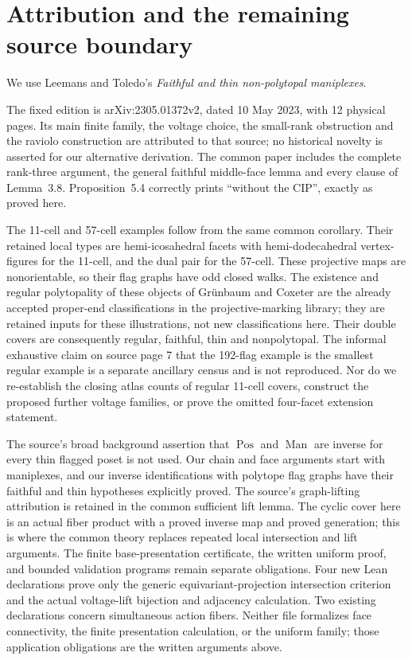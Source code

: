\documentclass[a4paper,11pt]{article}
\begin{document}
\section{Attribution and the remaining source boundary}
We use Leemans and Toledo's \emph{Faithful and thin non-polytopal
maniplexes}.

The fixed edition is arXiv:2305.01372v2, dated 10 May 2023,
with 12 physical pages. Its main finite family, the voltage choice, the small-rank
obstruction and the raviolo construction are attributed to that source;
no historical novelty is asserted for our alternative derivation.
The common paper includes the complete rank-three argument, the general
faithful middle-face lemma and every clause of Lemma~3.8. Proposition~5.4
correctly prints ``without the CIP'', exactly as proved here.

The 11-cell and 57-cell examples follow from the same common corollary.
Their retained local types are hemi-icosahedral facets with hemi-dodecahedral vertex-figures for
the 11-cell, and the dual pair for the 57-cell. These projective maps are nonorientable,
so their flag graphs have odd closed walks. The existence and regular
polytopality of these objects of Gr\"unbaum and Coxeter are the already accepted
proper-end classifications in the projective-marking library; they are
retained inputs for these illustrations, not new classifications here.
Their double covers are consequently regular, faithful, thin and
nonpolytopal. The informal exhaustive claim on source page 7 that the
192-flag example is the smallest regular example is a separate ancillary
census and is not reproduced. Nor do we re-establish the closing atlas
counts of regular 11-cell covers, construct the proposed further voltage
families, or prove the omitted four-facet extension statement.

The source's broad background assertion that $\operatorname{Pos}$ and
$\operatorname{Man}$ are inverse for every thin flagged poset is not used.
Our chain and face arguments start with maniplexes, and our inverse
identifications with polytope flag graphs have their faithful and thin
hypotheses explicitly proved. The source's graph-lifting attribution is
retained in the common sufficient lift lemma. The cyclic cover here is
an actual fiber product with a proved inverse map and proved generation;
this is where the common theory replaces repeated local intersection
and lift arguments. The finite base-presentation certificate, the
written uniform proof, and bounded validation programs remain
separate obligations. Four new Lean declarations prove only the generic
equivariant-projection intersection criterion and the actual voltage-lift
bijection and adjacency calculation. Two existing declarations concern
simultaneous action fibers. Neither file formalizes face connectivity,
the finite presentation calculation, or the uniform family; those
application obligations are the written arguments above.
\end{document}
